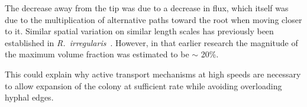 The decrease away from the tip was due to a decrease in flux, which itself was due to the multiplication of alternative paths toward the root when moving closer to it.
Similar spatial variation on similar length scales has previously been established in \emph{R.~irregularis}~\cite{bago_carbon_2000}.
However, in that earlier research the magnitude of the maximum volume fraction was estimated to be $\sim$ 20\%. 


This could explain why active transport mechanisms at high speeds are necessary to allow expansion of the colony at sufficient rate while avoiding overloading hyphal edges.


